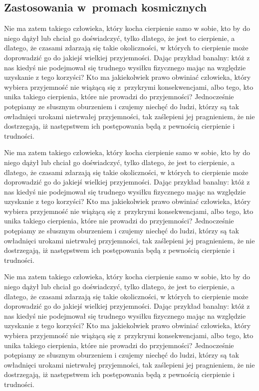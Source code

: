 \documentclass[12pt]{mwbk}
\theoremstyle{plain}
\theoremstyle{definition}
\theoremstyle{remark}
\begin{document}
\subsection{Zastosowania w~promach kosmicznych}
Nie ma zatem takiego człowieka, który kocha cierpienie samo w sobie, 
kto by do niego dążył lub chciał go doświadczyć, tylko dlatego, że
jest to cierpienie, a dlatego, że czasami zdarzają się takie 
okoliczności, w których to cierpienie może doprowadzić 
go do jakiejś wielkiej przyjemności. 
Dając przykład banalny: któż z nas kiedyś nie podejmował 
się trudnego wysiłku fizycznego mając na względzie 
uzyskanie z tego korzyści? 
Kto ma jakiekolwiek prawo obwiniać człowieka, 
który wybiera przyjemność nie wiążącą się z~przykrymi 
konsekwencjami, albo tego, kto unika takiego cierpienia, 
które nie prowadzi do przyjemności? 
Jednocześnie potępiamy ze słusznym oburzeniem i czujemy 
niechęć do ludzi, którzy są tak owładnięci urokami nietrwałej 
przyjemności, tak zaślepieni jej pragnieniem, 
że nie dostrzegają, iż następstwem ich 
postępowania będą z pewnością cierpienie i trudności.

Nie ma zatem takiego człowieka, który kocha cierpienie samo w sobie, 
kto by do niego dążył lub chciał go doświadczyć, tylko dlatego, że
jest to cierpienie, a dlatego, że czasami zdarzają się takie 
okoliczności, w których to cierpienie może doprowadzić 
go do jakiejś wielkiej przyjemności. 
Dając przykład banalny: któż z nas kiedyś nie podejmował 
się trudnego wysiłku fizycznego mając na względzie 
uzyskanie z tego korzyści? 
Kto ma jakiekolwiek prawo obwiniać człowieka, 
który wybiera przyjemność nie wiążącą się z~przykrymi 
konsekwencjami, albo tego, kto unika takiego cierpienia, 
które nie prowadzi do przyjemności? 
Jednocześnie potępiamy ze słusznym oburzeniem i czujemy 
niechęć do ludzi, którzy są tak owładnięci urokami nietrwałej 
przyjemności, tak zaślepieni jej pragnieniem, 
że nie dostrzegają, iż następstwem ich 
postępowania będą z pewnością cierpienie i trudności.

Nie ma zatem takiego człowieka, który kocha cierpienie samo w sobie, 
kto by do niego dążył lub chciał go doświadczyć, tylko dlatego, że
jest to cierpienie, a dlatego, że czasami zdarzają się takie 
okoliczności, w których to cierpienie może doprowadzić 
go do jakiejś wielkiej przyjemności. 
Dając przykład banalny: któż z nas kiedyś nie podejmował 
się trudnego wysiłku fizycznego mając na względzie 
uzyskanie z tego korzyści? 
Kto ma jakiekolwiek prawo obwiniać człowieka, 
który wybiera przyjemność nie wiążącą się z~przykrymi 
konsekwencjami, albo tego, kto unika takiego cierpienia, 
które nie prowadzi do przyjemności? 
Jednocześnie potępiamy ze słusznym oburzeniem i czujemy 
niechęć do ludzi, którzy są tak owładnięci urokami nietrwałej 
przyjemności, tak zaślepieni jej pragnieniem, 
że nie dostrzegają, iż następstwem ich 
postępowania będą z pewnością cierpienie i trudności.
\end{document}
